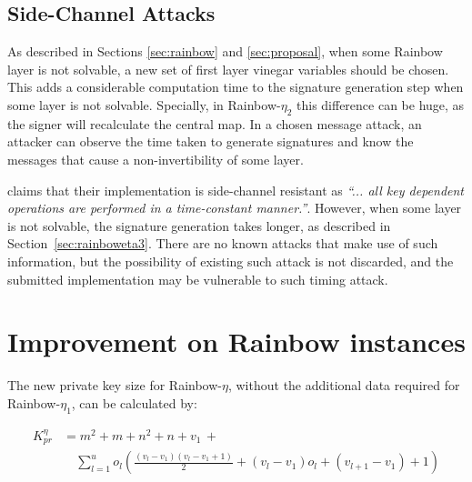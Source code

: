 \documentclass{ufsctex/ufsctex}
\begin{document}
\subsection{Side-Channel Attacks}

As described in Sections \ref{sec:rainbow} and \ref{sec:proposal}, when some
Rainbow layer is not solvable, a new set of first layer vinegar variables
should be chosen. This adds a considerable computation time to the signature
generation step when some layer is not solvable. Specially, in Rainbow-$\eta_2$
this difference can be huge, as the signer will recalculate the central map. In
a chosen message attack, an attacker can observe the time taken to generate
signatures and know the messages that cause a non-invertibility of some layer.

\cite{ding2017nist} claims that their implementation is side-channel resistant
as \textit{``... all key dependent operations are performed in a time-constant
manner.''}. However, when some layer is not solvable, the signature generation
takes longer, as described in Section~\ref{sec:rainboweta3}. There are no known
attacks that make use of such information, but the possibility of existing such
attack is not discarded, and the submitted implementation may be vulnerable to
such timing attack.

\section{Improvement on Rainbow instances}

The new private key size for Rainbow-$\eta$, without the additional data
required for Rainbow-$\eta_1$, can be calculated by:

\begin{equation}\label{eq:etaprivatekeysize}
\begin{split}
K^{\eta}_{pr} &=
m^2 + m + n^2 + n + v_1 \, + \\
&\quad \sum_{l=1}^{u} o_l \left(
\frac{(v_l - v_1)(v_l - v_1 + 1)}{2} + (v_l - v_1) o_l + (v_{l+1} - v_1) + 1
\right)
\end{split}
\end{equation}
\end{document}
